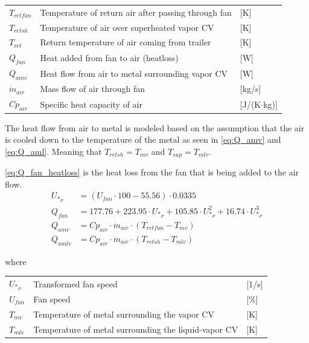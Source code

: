 \begin{center}
	\begin{tabular}{l p{10cm} l}
		$T_{retfan}$    & Temperature of return air after passing through fan & [\si{K}]                          \\
		$T_{retsh}$     & Temperature of air over superheated vapor CV        & [\si{K}]                          \\
		$T_{ret}$       & Return temperature of air coming from trailer       & [\si{K}]                          \\
		$Q_{fan}$       & Heat added from fan to air (heatloss)               & [\si{W}]                          \\
		$Q_{amv}$       & Heat flow from air to metal surrounding vapor CV    & [\si{W}]                          \\
		$\dot{m}_{air}$ & Mass flow of air through fan                        & [\si{kg}/\si{s}]                  \\
		$Cp_{air}$      & Specific heat capacity of air                       & [\si{J}/(\si{K}$ \cdot $\si{kg})]
	\end{tabular}
\end{center}

\medskip
The heat flow from air to metal is modeled based on the assumption that the air is cooled down to the temperature of the metal as seen in \cref{eq:Q_amv} and \cref{eq:Q_aml}. Meaning that $T_{retsh} = T_{mv}$ and $T_{sup} = T_{mlv}$.

\cref{eq:Q_fan_heatloss} is the heat loss from the fan that is being added to the air flow. 
\begin{align}
	U_{*_P} & = \left( U_{fan}\cdot 100 - 55.56 \right) \cdot 0.0335                                         \\
	Q_{fan} & = 177.76 + 223.95 \cdot U_{*_P} + 105.85 \cdot U_{*_P}^2 + 16.74 \cdot U_{*_P}^3	\label{eq:Q_fan_heatloss} \\
	Q_{amv} & = Cp_{air} \cdot \dot{m}_{air} \cdot (T_{retfan} - T_{mv}) 	\label{eq:Q_amv}                                \\
	Q_{amlv} & = Cp_{air} \cdot \dot{m}_{air} \cdot (T_{retsh} - T_{mlv}) 	\label{eq:Q_aml}
\end{align}

where
\smallskip
\begin{center}
	\begin{tabular}{l p{10cm} l}
		$U_{*_P}$       & Transformed fan speed                                & [1/\si{s}]                        \\
		$U_{fan}$       & Fan speed                                            & [$\%$]                        \\
		$T_{mv}$        & Temperature of metal surrounding the vapor CV        & [\si{K}]                          \\
		$T_{mlv}$       & Temperature of metal surrounding the liquid-vapor CV & [\si{K}]
	\end{tabular}
\end{center}


